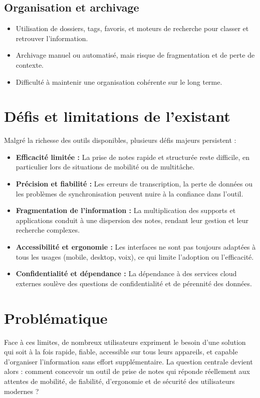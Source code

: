 \subsection{Organisation et archivage}
\begin{itemize}
    \item Utilisation de dossiers, tags, favoris, et moteurs de recherche pour classer et retrouver l’information.
    \item Archivage manuel ou automatisé, mais risque de fragmentation et de perte de contexte.
    \item Difficulté à maintenir une organisation cohérente sur le long terme.
\end{itemize}

\section{Défis et limitations de l’existant}

Malgré la richesse des outils disponibles, plusieurs défis majeurs persistent :
\begin{itemize}
    \item \textbf{Efficacité limitée :} La prise de notes rapide et structurée reste difficile, en particulier lors de situations de mobilité ou de multitâche.
    \item \textbf{Précision et fiabilité :} Les erreurs de transcription, la perte de données ou les problèmes de synchronisation peuvent nuire à la confiance dans l’outil.
    \item \textbf{Fragmentation de l’information :} La multiplication des supports et applications conduit à une dispersion des notes, rendant leur gestion et leur recherche complexes.
    \item \textbf{Accessibilité et ergonomie :} Les interfaces ne sont pas toujours adaptées à tous les usages (mobile, desktop, voix), ce qui limite l’adoption ou l’efficacité.
    \item \textbf{Confidentialité et dépendance :} La dépendance à des services cloud externes soulève des questions de confidentialité et de pérennité des données.
\end{itemize}

\section{Problématique}

Face à ces limites, de nombreux utilisateurs expriment le besoin d’une solution qui soit à la fois rapide, fiable, accessible sur tous leurs appareils, et capable d’organiser l’information sans effort supplémentaire. La question centrale devient alors : comment concevoir un outil de prise de notes qui réponde réellement aux attentes de mobilité, de fiabilité, d’ergonomie et de sécurité des utilisateurs modernes ?

